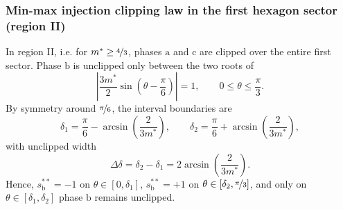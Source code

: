 \begin{frame}
    \frametitle{Min-max injection clipping law in the first hexagon sector (region II)}
    In region II, i.e. for $m^* \geq \nicefrac{4}{3}$, phases $\mathrm{a}$ and $\mathrm{c}$ are clipped over the entire first sector.
    Phase $\mathrm{b}$ is unclipped only between the two roots of
    \begin{equation}
        \left|\frac{3m^*}{2}\sin\!\left(\theta-\frac{\pi}{6}\right)\right| = 1,
        \qquad 0 \leq \theta \leq \frac{\pi}{3}.
    \end{equation}\pause
    By symmetry around $\nicefrac{\pi}{6}$, the interval boundaries are
    \begin{equation}
        \delta_1 = \frac{\pi}{6} - \arcsin\!\left(\frac{2}{3m^*}\right),
        \qquad
        \delta_2 = \frac{\pi}{6} + \arcsin\!\left(\frac{2}{3m^*}\right),
    \end{equation}
    with unclipped width
    \begin{equation}
        \Delta\delta = \delta_2 - \delta_1 = 2\arcsin\!\left(\frac{2}{3m^*}\right).
    \end{equation}\pause
    Hence, $s_\mathrm{b}^{**}=-1$ on $\theta \in [0,\delta_1]$, $s_\mathrm{b}^{**}=+1$ on $\theta \in [\delta_2,\nicefrac{\pi}{3}]$, and only on $\theta \in [\delta_1,\delta_2]$ phase $\mathrm{b}$ remains unclipped.
\end{frame}


